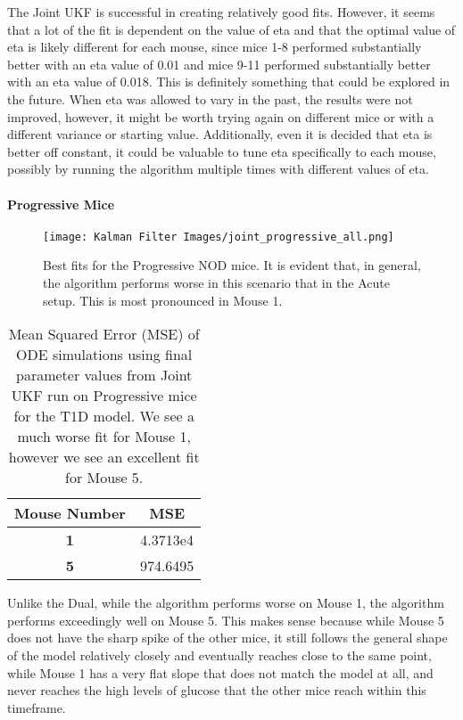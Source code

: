The Joint UKF is successful in creating relatively good fits. However, it seems that a lot of the fit is dependent on the value of eta and that the optimal value of eta is likely different for each mouse, since mice 1-8 performed substantially better with an eta value of 0.01 and mice 9-11 performed substantially better with an eta value of 0.018. This is definitely something that could be explored in the future. When eta was allowed to vary in the past, the results were not improved, however, it might be worth trying again on different mice or with a different variance or starting value. Additionally, even it is decided that eta is better off constant, it could be valuable to tune  eta specifically to each mouse, possibly by running the algorithm multiple times with different values of eta.

\paragraph{Progressive Mice}

\begin{figure}[H]
    \centering
    \texttt{[image: Kalman Filter Images/joint\_progressive\_all.png]}
    \caption{Best fits for the Progressive NOD mice. It is evident that, in general, the algorithm performs worse in this scenario that in the Acute setup. This is most pronounced in Mouse 1.}
\end{figure}

\begin{table}[H]
  \begin{center}
    \label{tab:table1}
    \begin{tabular}{c|c} %
      \textbf{Mouse Number} & \textbf{MSE} \\
      \hline
      \textbf{1} & 4.3713e4\\
      \textbf{5} & 974.6495
    \end{tabular}
    \caption{Mean Squared Error (MSE) of ODE simulations using final parameter values from Joint UKF run on Progressive mice for the T1D model. We see a much worse fit for Mouse 1, however we see an excellent fit for Mouse 5.}
  \end{center}
\end{table}

Unlike the Dual, while the algorithm performs worse on Mouse 1, the algorithm performs exceedingly well on Mouse 5. This makes sense because while Mouse 5 does not have the sharp spike of the other mice, it still follows the general shape of the model relatively closely  and eventually reaches close to the same point, while Mouse 1 has a very flat slope that does not match the model at all, and never reaches the high levels of glucose that the other mice reach within this timeframe. 

